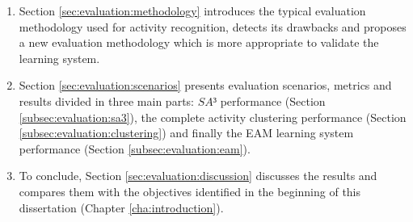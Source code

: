 \begin{enumerate}
 \item Section \ref{sec:evaluation:methodology} introduces the typical evaluation methodology used for activity recognition, detects its drawbacks and proposes a new evaluation methodology which is more appropriate to validate the learning system. %
 \item Section \ref{sec:evaluation:scenarios} presents evaluation scenarios, metrics and results divided in three main parts: $SA³$ performance (Section \ref{subsec:evaluation:sa3}), the complete activity clustering performance (Section \ref{subsec:evaluation:clustering}) and finally the EAM learning system performance (Section \ref{subsec:evaluation:eam}). 
 \item To conclude, Section \ref{sec:evaluation:discussion} discusses the results and compares them with the objectives identified in the beginning of this dissertation (Chapter \ref{cha:introduction}). %
\end{enumerate}
